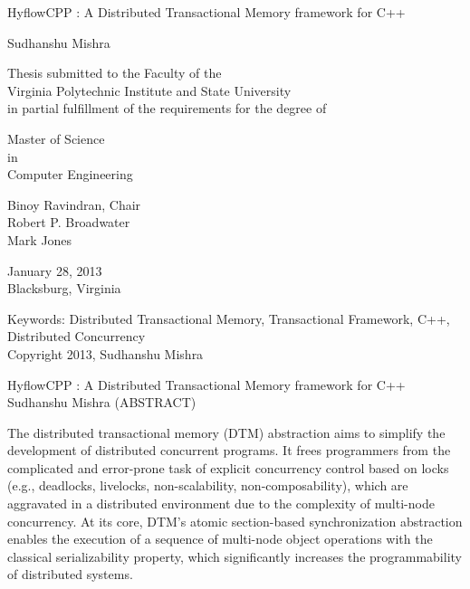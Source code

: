 \documentclass[12pt,english]{report}
\begin{document}
\thispagestyle{empty}
\begin{center}

{\Large 
HyflowCPP : A Distributed Transactional Memory framework for C++
}

\vfill

Sudhanshu Mishra

\vfill

Thesis submitted to the Faculty of the \\
Virginia Polytechnic Institute and State University \\
in partial fulfillment of the requirements for the degree of

\vfill

Master of Science \\
in \\
Computer Engineering


\vfill

Binoy Ravindran, Chair \\
Robert P. Broadwater \\
Mark Jones


\vfill

January 28, 2013 \\
Blacksburg, Virginia

\vfill

Keywords: Distributed Transactional Memory, Transactional Framework, C++, Distributed Concurrency
\\
Copyright 2013, Sudhanshu Mishra

\end{center}

\pagebreak

\thispagestyle{empty}
\begin{center}

{\large
HyflowCPP : A Distributed Transactional Memory framework for C++
}
\vfill
Sudhanshu Mishra
\vfill
(ABSTRACT)
\vfill
\end{center}
The distributed transactional memory (DTM) abstraction aims to simplify the development of distributed concurrent programs. It frees programmers from the complicated and error-prone task of explicit concurrency control based on locks (e.g., deadlocks, livelocks, non-scalability, non-composability), which are aggravated in a distributed environment due to the complexity of multi-node concurrency. At its core, DTM's atomic section-based synchronization abstraction enables the execution of a sequence of multi-node object operations with the classical serializability property, which significantly increases the programmability of distributed systems. 
\end{document}
